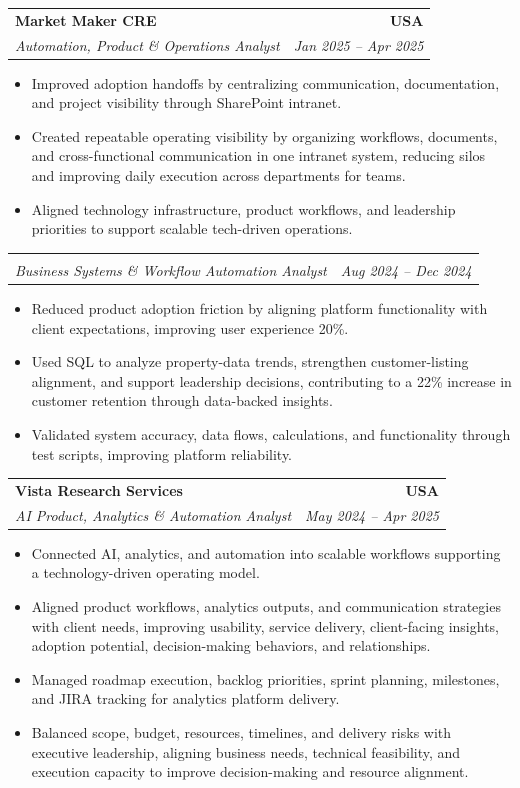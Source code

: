\documentclass[letterpaper,10pt]{article}
\makeatletter
\newcommand{\resumeItem}[1]{\item \small{#1}}
\newcommand{\resumeSubheading}[4]{
  \vspace{1pt}\item
    \begin{tabular*}{1.0\textwidth}[t]{l@{\extracolsep{\fill}}r}
      \textbf{#1} & \textbf{\small #2} \\
      \textit{\small #3} & \textit{\small #4} \\
    \end{tabular*}\vspace{-6pt}
}
\newcommand{\resumeItemListStart}{\begin{itemize}[leftmargin=0.15in, itemsep=1pt, topsep=3pt]}
\newcommand{\resumeItemListEnd}{\end{itemize}\vspace{-2pt}}
\makeatother
\begin{document}
\vspace{-2pt}

\resumeSubheading
{Market Maker CRE}{USA}
{Automation, Product \& Operations Analyst}{Jan 2025 -- Apr 2025}
\resumeItemListStart
\resumeItem{Improved adoption handoffs by centralizing communication, documentation, and project visibility through SharePoint intranet.}
\resumeItem{Created repeatable operating visibility by organizing workflows, documents, and cross-functional communication in one intranet system, reducing silos and improving daily execution across departments for teams.}
\resumeItem{Aligned technology infrastructure, product workflows, and leadership priorities to support scalable tech-driven operations.}
\resumeItemListEnd

\vspace{-12pt}

\resumeSubheading
{}{}
{Business Systems \& Workflow Automation Analyst}{Aug 2024 -- Dec 2024}
\resumeItemListStart
\resumeItem{Reduced product adoption friction by aligning platform functionality with client expectations, improving user experience 20\%.}
\resumeItem{Used SQL to analyze property-data trends, strengthen customer-listing alignment, and support leadership decisions, contributing to a 22\% increase in customer retention through data-backed insights.}
\resumeItem{Validated system accuracy, data flows, calculations, and functionality through test scripts, improving platform reliability.}
\resumeItemListEnd

\vspace{-2pt}

\resumeSubheading
{Vista Research Services}{USA}
{AI Product, Analytics \& Automation Analyst}{May 2024 -- Apr 2025}
\resumeItemListStart
\resumeItem{Connected AI, analytics, and automation into scalable workflows supporting a technology-driven operating model.}
\resumeItem{Aligned product workflows, analytics outputs, and communication strategies with client needs, improving usability, service delivery, client-facing insights, adoption potential, decision-making behaviors, and relationships.}
\resumeItem{Managed roadmap execution, backlog priorities, sprint planning, milestones, and JIRA tracking for analytics platform delivery.}
\resumeItem{Balanced scope, budget, resources, timelines, and delivery risks with executive leadership, aligning business needs, technical feasibility, and execution capacity to improve decision-making and resource alignment.}
\resumeItemListEnd

\vspace{-2pt}
\end{document}
